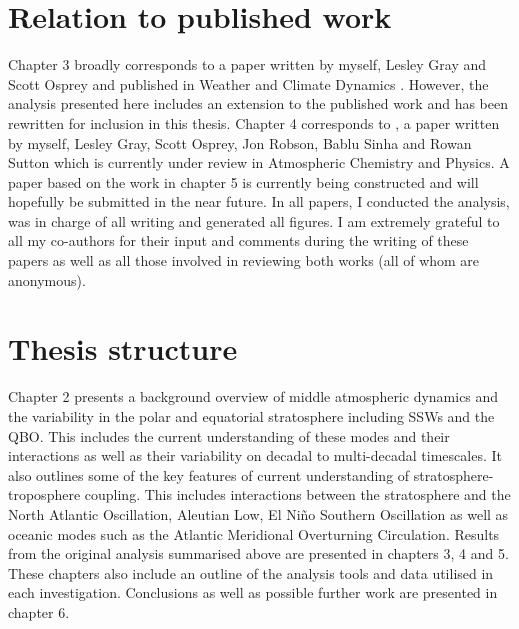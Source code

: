\section{Relation to published work}

Chapter 3 broadly corresponds to a paper written by myself, Lesley Gray and Scott Osprey and published in Weather and Climate Dynamics \citep{dimdore-milesOrigins2021}. However, the analysis presented here includes an extension to the published work and has been rewritten for inclusion in this thesis. Chapter 4 corresponds to \cite{dimdore-milesInteractions2021}, a paper written by myself, Lesley Gray, Scott Osprey, Jon Robson, Bablu Sinha and Rowan Sutton which is currently under review in Atmospheric Chemistry and Physics. A paper based on the work in chapter 5 is currently being constructed and will hopefully be submitted in the near future. 
In all papers, I conducted the analysis, was in charge of all writing and generated all figures. I am extremely grateful to all my co-authors for their input and comments during the writing of these papers as well as all those involved in reviewing both works (all of whom are anonymous).  

\section{Thesis structure}
Chapter 2 presents a background overview of middle atmospheric dynamics and the variability in the polar and equatorial stratosphere including SSWs and the QBO. This includes the current understanding of these modes and their interactions as well as their variability on decadal to multi-decadal timescales. It also outlines some of the key features of current understanding of stratosphere-troposphere coupling. This includes interactions between the stratosphere and the North Atlantic Oscillation, Aleutian Low, El Ni\~{n}o Southern Oscillation as well as oceanic modes such as the Atlantic Meridional Overturning Circulation. Results from the original analysis summarised above are presented in chapters 3, 4 and 5. These chapters also include an outline of the analysis tools and data utilised in each investigation. Conclusions as well as possible further work are presented in chapter 6.








